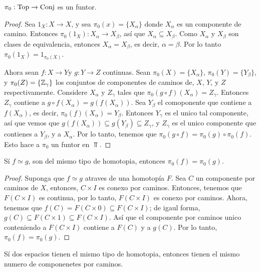 \begin{theorem}\label{thm_9.20}
    $\pi_0:\operatorname{Top} \xrightarrow{} \operatorname{Conj}$ es un funtor.
\end{theorem}
\begin{proof}
    Sea $1_X:X \xrightarrow{} X$, y sea $\pi_0(x)=\{X_\alpha\}$ donde $X_\alpha$
    es un componente de camino. Entonces $\pi_0(1_X):X_\alpha \xrightarrow{}
    X_\beta$, as\'i que $X_\alpha \subseteq X_\beta$. Como  $X_\alpha$ y
    $X_\beta$ son clases de equivalencia, entonces  $X_\alpha=X_\beta$, es
    decir,  $\alpha=\beta$. Por lo tanto  $\pi_0(1_X)=1_{\pi_0(X)}$.

    Ahora sean $f:X \xrightarrow{} Y$y $g:Y \xrightarrow{} Z$ continuas. Sean
    $\pi_0(X)=\{X_\alpha\}$, $\pi_0(Y)=\{Y_\beta\}$, y $\pi_0(Z)=\{\mathbb{Z}_\gamma\}$
    los conjuntos de componentes de caminos de,  $X$,  $Y$, y  $Z$
    respectivamente. Considere  $X_\alpha$ y  $Z_\gamma$ tales que  $\pi_0(g
    \circ f)(X_\alpha)=Z_\gamma$. Entonces $Z_\gamma$ contiene a $g \circ
    f(X_\alpha)=g(f(X_\alpha))$. Sea $Y_\beta$ el comoponente que contiene a
    $f(X_\alpha)$, es decir, $\pi_0(f)(X_\alpha)=Y_\beta$. Entonces $Y_\gamma$
    es el unico tal componente, as\'i que vemos que
    $g(f(X_\alpha)) \subseteq g(Y_\beta) \subseteq Z_\gamma$, y $Z_\gamma$ es el
    unico componente que contienes a  $Y_\beta$, y a  $X_\alpha$. Por lo tanto,
    tenemos que $\pi_0(g \circ f)=\pi_0(g) \circ \pi_0(f)$. Esto hace a $\pi_0$
    un funtor en $\Top.$
\end{proof}
\begin{corollary}
    S\'i  $f \simeq g$, son del mismo tipo de homotopia, entonces  $\pi_0(f) = \pi_0(g)$.
\end{corollary}
\begin{proof}
    Suponga que $f \simeq g$ atraves de una homotop\'ia $F$. Sea $C$ un
    componente por caminos de  $X$, entonces,  $C \times I$ es conexo por
    caminos. Entonces, tenemos que $F(C \times I)$ es continua, por lo tanto,
    $F(C \times I)$ es conexo por caminos. Ahora, tenemos que $f(C)=F(C \times 0)
    \subseteq F(C \times I)$; de igaul forma, $g(C) \subseteq F(C \times 1)
    \subseteq F(C \times I)$. As\'i que el componente por caminos unico
    conteniendo a  $F(C \times I)$ contiene a $F(C)$ y a $g(C)$. Por lo tanto,
    $\pi_0(f)=\pi_0(g)$.
\end{proof}
\begin{corollary}
    S\'i dos espacios tienen el mismo tipo de homotopia, entonces tienen el
    mismo numero de componenetes por caminos.
\end{corollary}
